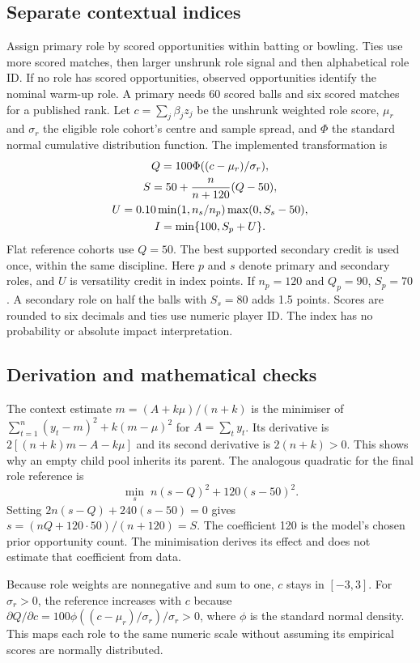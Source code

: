 \documentclass[12pt,a4paper]{article}
\begin{document}
\subsection{Separate contextual indices}
Assign primary role by scored opportunities within batting or bowling. Ties use more scored matches, then larger unshrunk role signal and then alphabetical role ID. If no role has scored opportunities, observed opportunities identify the nominal warm-up role. A primary needs 60 scored balls and six scored matches for a published rank. Let $c=\sum_j\beta_j z_j$ be the unshrunk weighted role score, $\mu_r$ and $\sigma_r$ the eligible role cohort's centre and sample spread, and $\Phi$ the standard normal cumulative distribution function. The implemented transformation is
\begin{gather}
Q=100\Phi((c-\mu_r)/\sigma_r),\\
S=50+\frac{n}{n+120}(Q-50),\\
U=0.10\min(1,n_s/n_p)\max(0,S_s-50),\notag\\
I=\min\{100,S_p+U\}.
\label{eq:overall}
\end{gather}
Flat reference cohorts use $Q=50$. The best supported secondary credit is used once, within the same discipline. Here $p$ and $s$ denote primary and secondary roles, and $U$ is versatility credit in index points. If $n_p=120$ and $Q_p=90$, $S_p=70$. A secondary role on half the balls with $S_s=80$ adds 1.5 points. Scores are rounded to six decimals and ties use numeric player ID. The index has no probability or absolute impact interpretation.

\subsection{Derivation and mathematical checks}
The context estimate $m=(A+k\mu)/(n+k)$ is the minimiser of
$\sum_{t=1}^n(y_t-m)^2+k(m-\mu)^2$ for $A=\sum_t y_t$. Its derivative is $2[(n+k)m-A-k\mu]$ and its second derivative is $2(n+k)>0$. This shows why an empty child pool inherits its parent. The analogous quadratic for the final role reference is
\[
\min_s\; n(s-Q)^2+120(s-50)^2.
\]
Setting $2n(s-Q)+240(s-50)=0$ gives $s=(nQ+120\cdot50)/(n+120)=S$. The coefficient 120 is the model's chosen prior opportunity count. The minimisation derives its effect and does not estimate that coefficient from data.

Because role weights are nonnegative and sum to one, $c$ stays in $[-3,3]$. For $\sigma_r>0$, the reference increases with $c$ because $\partial Q/\partial c=100\phi((c-\mu_r)/\sigma_r)/\sigma_r>0$, where $\phi$ is the standard normal density. This maps each role to the same numeric scale without assuming its empirical scores are normally distributed.
\end{document}
